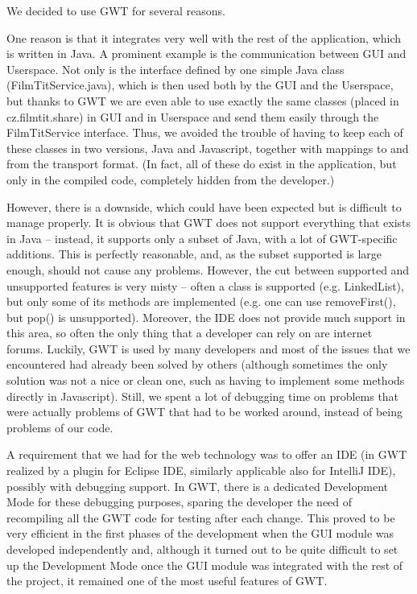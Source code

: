 
We decided to use GWT for several reasons.

One reason is that it integrates very well with the rest of the application, which is written in Java. A prominent example is the communication between GUI and Userspace. Not only is the interface defined by one simple Java class (FilmTitService.java), which is then used both by the GUI and the Userspace, but thanks to GWT we are even able to use exactly the same classes (placed in cz.filmtit.share) in GUI and in Userspace and send them easily through the FilmTitService interface. Thus, we avoided the trouble of having to keep each of these classes in two versions, Java and Javascript, together with mappings to and from the transport format. (In fact, all of these do exist in the application, but only in the compiled code, completely hidden from the developer.)

However, there is a downside, which could have been expected but is difficult to manage properly. It is obvious that GWT does not support everything that exists in Java -- instead, it supports only a subset of Java, with a lot of GWT-specific additions. This is perfectly reasonable, and, as the subset supported is large enough, should not cause any problems. However, the cut between supported and unsupported features is very misty -- often a class is supported (e.g. LinkedList), but only some of its methods are implemented (e.g. one can use removeFirst(), but pop() is unsupported). Moreover, the IDE does not provide much support in this area, so often the only thing that a developer can rely on are internet forums. Luckily, GWT is used by many developers and most of the issues that we encountered had already been solved by others (although sometimes the only solution was not a nice or clean one, such as having to implement some methods directly in Javascript). Still, we spent a lot of debugging time on problems that were actually problems of GWT that had to be worked around, instead of being problems of our code.

A requirement that we had for the web technology was to offer an IDE (in GWT realized by a plugin for Eclipse IDE, similarly applicable also for IntelliJ IDE), possibly with debugging support. In GWT, there is a dedicated Development Mode for these debugging purposes, sparing the developer the need of recompiling all the GWT code for testing after each change. This proved to be very efficient in the first phases of the development when the GUI module was developed independently and, although it turned out to be quite difficult to set up the Development Mode once the GUI module was integrated with the rest of the project, it remained one of the most useful features of GWT.

